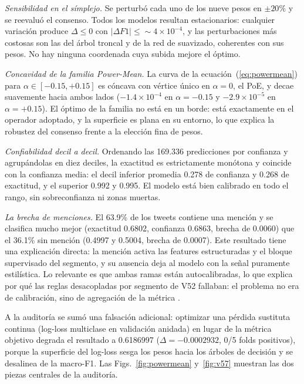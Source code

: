 \documentclass[journal]{IEEEtai}
\begin{document}
\emph{Sensibilidad en el s\'implejo.} Se perturb\'o cada uno de los nueve pesos en $\pm 20\%$ y se reevalu\'o el consenso. Todos los modelos resultan estacionarios: cualquier variaci\'on produce $\Delta \le 0$ con $|\Delta F1| \le \sim 4 \times 10^{-4}$, y las perturbaciones m\'as costosas son las del \'arbol troncal y de la red de suavizado, coherentes con sus pesos. No hay ninguna coordenada cuya subida mejore el \'optimo.

\emph{Concavidad de la familia Power-Mean.} La curva de la ecuaci\'on~(\ref{eq:powermean}) para $\alpha \in [-0.15, +0.15]$ es c\'oncava con v\'ertice \'unico en $\alpha = 0$, el PoE, y decae suavemente hacia ambos lados ($-1.4 \times 10^{-4}$ en $\alpha = -0.15$ y $-2.9 \times 10^{-5}$ en $\alpha = +0.15$). El \'optimo de la familia no est\'a en un borde: est\'a exactamente en el operador adoptado, y la superficie es plana en su entorno, lo que explica la robustez del consenso frente a la elecci\'on fina de pesos.

\emph{Confiabilidad decil a decil.} Ordenando las 169.336 predicciones por confianza y agrup\'andolas en diez deciles, la exactitud es estrictamente mon\'otona y coincide con la confianza media: el decil inferior promedia 0.278 de confianza y 0.268 de exactitud, y el superior 0.992 y 0.995. El modelo est\'a bien calibrado en todo el rango, sin sobreconfianza ni zonas muertas.

\emph{La brecha de menciones.} El 63.9\% de los tweets contiene una menci\'on y se clasifica mucho mejor (exactitud 0.6802, confianza 0.6863, brecha de 0.0060) que el 36.1\% sin menci\'on (0.4997 y 0.5004, brecha de 0.0007). Este resultado tiene una explicaci\'on directa: la menci\'on activa las features estructuradas y el bloque supervisado del segmento, y su ausencia deja al modelo con la se\~nal puramente estil\'istica. Lo relevante es que ambas ramas est\'an autocalibradas, lo que explica por qu\'e las reglas desacopladas por segmento de V52 fallaban: el problema no era de calibraci\'on, sino de agregaci\'on de la m\'etrica \cite{simpson1951}.

A la auditor\'ia se sum\'o una falsaci\'on adicional: optimizar una p\'erdida sustituta continua (log-loss multiclase en validaci\'on anidada) en lugar de la m\'etrica objetivo degrada el resultado a 0.6186997 ($\Delta = -0.0002932$, 0/5 folds positivos), porque la superficie del log-loss sesga los pesos hacia los \'arboles de decisi\'on y se desalinea de la macro-F1. Las Figs.~\ref{fig:powermean} y~\ref{fig:v57} muestran las dos piezas centrales de la auditor\'ia.
\end{document}
